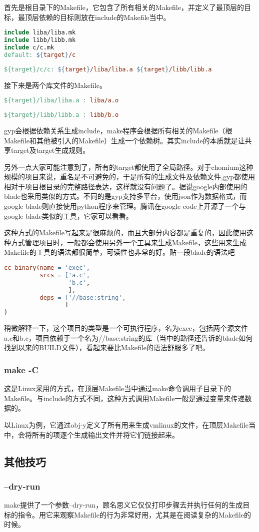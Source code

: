 首先是根目录下的Makefile，它包含了所有相关的Makefile，并定义了最顶层的目标，最顶层依赖的目标则放在include的Makefile当中。
\begin{lstlisting}[language=make]
include liba/liba.mk
include libb/libb.mk
include c/c.mk
default: ${target}/c
\end{lstlisting}

\begin{lstlisting}[language=make]
${target}/c/c: ${target}/liba/liba.a ${target}/libb/libb.a
\end{lstlisting}

接下来是两个库文件的Makefile。
\begin{lstlisting}[language=make]
${target}/liba/liba.a : liba/a.o
\end{lstlisting}

\begin{lstlisting}[language=make]
${target}/libb/libb.a : libb/b.o
\end{lstlisting}
gyp会根据依赖关系生成include，make程序会根据所有相关的Makefile（根Makefile和其他被引入的Makefile）生成一个依赖树。其实include的本质就是让共享target及target生成规则。

另外一点大家可能注意到了，所有的target都使用了全局路径。对于chomium这种规模的项目来说，重名是不可避免的，于是所有的生成文件及依赖文件,gyp都使用相对于项目根目录的完整路径表达，这样就没有问题了。据说google内部使用的blade也采用类似的方式。不同的是gyp支持多平台，使用json作为数据格式，而google blade则直接使用python程序来管理。腾讯在google code上开源了一个与google blade类似的工具，它家可以看看。

这种方式的Makefile写起来是很麻烦的，而且大部分内容都是重复的，因此使用这种方式管理项目时，一般都会使用另外一个工具来生成Makefile，这些用来生成Makefile的工具的语法都很简单，可读性也非常的好。贴一段blade的语法吧

\begin{lstlisting}[language=make]
cc_binary(name = 'exec',
          srcs = ['a.c',
                  'b.c',
                  ],
          deps = ['//base:string',
                 ]
)
\end{lstlisting}
稍微解释一下，这个项目的类型是一个可执行程序，名为exec，包括两个源文件a.c和b.c，项目依赖于一个名为//base:string的库（当中的路径还告诉的blade如何找到以来的BUILD文件），看起来要比Makefile的语法舒服多了吧。

\subsubsection{make -C }
这是Linux采用的方式，在顶层Makefile当中通过make命令调用子目录下的Makefile。与include的方式不同，这种方式调用Makefile一般是通过变量来传递数据的。

以Linux为例，它通过obj-y定义了所有用来生成vmlinux的文件，在顶层Makefile当中，会将所有的项逐个生成输出文件并将它们链接起来。


\subsection{其他技巧}
\subsubsection{--dry-run}
make提供了一个参数--dry-run，顾名思义它仅仅打印步骤去并执行任何的生成目标的指令。用它来观察Makefile的行为非常好用，尤其是在阅读复杂的Makefile的时候。
